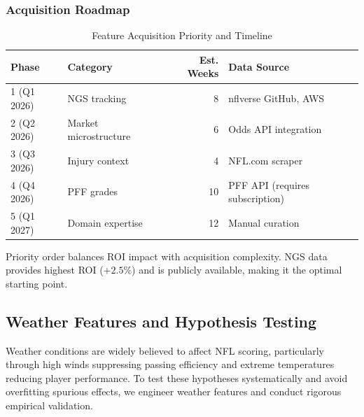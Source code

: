 \subsubsection{Acquisition Roadmap}

\begin{table}[htbp]
\centering
\caption{Feature Acquisition Priority and Timeline}
\label{tab:acquisition_roadmap}
\begin{tabular}{@{}llrp{4cm}@{}}
\toprule
\textbf{Phase} & \textbf{Category} & \textbf{Est. Weeks} & \textbf{Data Source} \\
\midrule
1 (Q1 2026) & NGS tracking & 8 & nflverse GitHub, AWS \\
2 (Q2 2026) & Market microstructure & 6 & Odds API integration \\
3 (Q3 2026) & Injury context & 4 & NFL.com scraper \\
4 (Q4 2026) & PFF grades & 10 & PFF API (requires subscription) \\
5 (Q1 2027) & Domain expertise & 12 & Manual curation \\
\bottomrule
\end{tabular}
\end{table}

Priority order balances ROI impact with acquisition complexity. NGS data provides highest ROI ($+2.5\%$) and is publicly available, making it the optimal starting point.

\subsection{Weather Features and Hypothesis Testing}
\label{subsec:weather-features}

Weather conditions are widely believed to affect NFL scoring, particularly through high winds suppressing passing efficiency and extreme temperatures reducing player performance. To test these hypotheses systematically and avoid overfitting spurious effects, we engineer weather features and conduct rigorous empirical validation.

